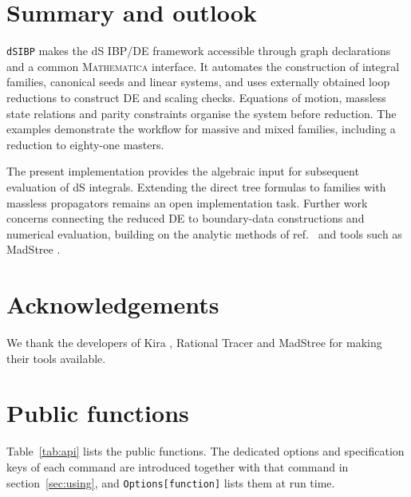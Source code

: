 \documentclass[11pt,a4paper]{article}
\begin{document}
\clearpage
\section{Summary and outlook}
\label{sec:summary}

\texttt{dSIBP} makes the dS IBP/DE framework accessible through graph declarations and a common
\textsc{Mathematica} interface. It automates the construction of integral families, canonical
seeds and linear systems, and uses externally obtained loop reductions to construct DE and
scaling checks. Equations of motion, massless state relations and parity constraints organise
the system before reduction. The examples demonstrate the workflow for massive and mixed
families, including a reduction to eighty-one masters.

The present implementation provides the algebraic input for subsequent evaluation of dS
integrals. Extending the direct tree formulas to families with massless propagators remains
an open implementation task. Further work concerns connecting the reduced DE to boundary-data
constructions and numerical evaluation, building on the analytic methods of
ref.~\cite{Chen:2024glu} and tools such as MadStree \cite{MadStree:inpreparation}.

\section*{Acknowledgements}

We thank the developers of Kira \cite{Maierhofer:2017gsa,Klappert:2020nbg}, Rational Tracer
\cite{Magerya:2022hvj} and MadStree \cite{MadStree:inpreparation} for making their tools available.

\clearpage
\appendix

\section{Public functions}
\label{app:api}

Table~\ref{tab:api} lists the public functions. The dedicated options and specification keys of
each command are introduced together with that command in section~\ref{sec:using}, and
\texttt{Options[function]} lists them at run time.
\end{document}
